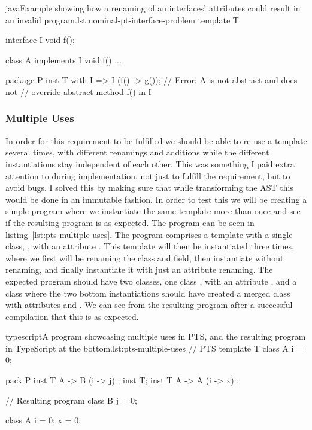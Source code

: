 \begin{code}{java}{Example showing how a renaming of an interfaces' attributes could result in an invalid program.}{lst:nominal-pt-interface-problem}
    template T {
        interface I {
            void f();
        }

        class A implements I {
            void f() { ... }
        }
    }

    package P {
        inst T with I => I (f() -> g());
        // Error: A is not abstract and does not
        // override abstract method f() in I
    }
\end{code}

\subsubsection{Multiple Uses}\label{subsubsec:pts-multiple-uses}

In order for this requirement to be fulfilled we should be able to re-use a template several times, with different renamings and additions while the different instantiations stay independent of each other.
This was something I paid extra attention to during implementation, not just to fulfill the requirement, but to avoid bugs.
I solved this by making sure that while transforming the AST this would be done in an immutable fashion.
In order to test this we will be creating a simple program where we instantiate the same template more than once and see if the resulting program is as expected.
The program can be seen in listing~\vref{lst:pts-multiple-uses}.
The program comprises a template  with a single class, , with an attribute .
This template will then be instantiated three times, where we first will be renaming the class and field, then instantiate without renaming, and finally instantiate it with just an attribute renaming.
The expected program should have two classes, one class , with an attribute , and a class  where the two bottom instantiations should have created a merged class with attributes  and .
We can see from the resulting program after a successful compilation that this is as expected.

\begin{code}{typescript}{A program showcasing multiple uses in PTS, and the resulting program in TypeScript at the bottom.}{lst:pts-multiple-uses}
    // PTS
    template T {
        class A {
            i = 0;
        }
    }

    pack P {
        inst T { A -> B (i -> j) };
        inst T;
        inst T { A -> A (i -> x) };
    }

    // Resulting program
    class B {
        j = 0;
    }

    class A {
        i = 0;
        x = 0;
    }
\end{code}

